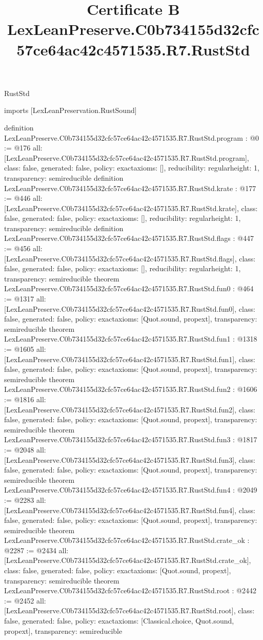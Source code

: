 \begin{lexlean}{RustStd}
\title{Certificate B LexLeanPreserve.C0b734155d32cfc57ce64ac42c4571535.R7.RustStd}
\begin{coremodule}
imports [LexLeanPreservation.RustSound]

definition LexLeanPreserve.C0b734155d32cfc57ce64ac42c4571535.R7.RustStd.program : @0 := @176 {
  all: [LexLeanPreserve.C0b734155d32cfc57ce64ac42c4571535.R7.RustStd.program],
  class: false,
  generated: false,
  policy: exact{axioms: []},
  reducibility: regular{height: 1},
  transparency: semireducible
}
definition LexLeanPreserve.C0b734155d32cfc57ce64ac42c4571535.R7.RustStd.krate : @177 := @446 {
  all: [LexLeanPreserve.C0b734155d32cfc57ce64ac42c4571535.R7.RustStd.krate],
  class: false,
  generated: false,
  policy: exact{axioms: []},
  reducibility: regular{height: 1},
  transparency: semireducible
}
definition LexLeanPreserve.C0b734155d32cfc57ce64ac42c4571535.R7.RustStd.flags : @447 := @456 {
  all: [LexLeanPreserve.C0b734155d32cfc57ce64ac42c4571535.R7.RustStd.flags],
  class: false,
  generated: false,
  policy: exact{axioms: []},
  reducibility: regular{height: 1},
  transparency: semireducible
}
theorem LexLeanPreserve.C0b734155d32cfc57ce64ac42c4571535.R7.RustStd.fun0 : @464 := @1317 {
  all: [LexLeanPreserve.C0b734155d32cfc57ce64ac42c4571535.R7.RustStd.fun0],
  class: false,
  generated: false,
  policy: exact{axioms: [Quot.sound, propext]},
  transparency: semireducible
}
theorem LexLeanPreserve.C0b734155d32cfc57ce64ac42c4571535.R7.RustStd.fun1 : @1318 := @1605 {
  all: [LexLeanPreserve.C0b734155d32cfc57ce64ac42c4571535.R7.RustStd.fun1],
  class: false,
  generated: false,
  policy: exact{axioms: [Quot.sound, propext]},
  transparency: semireducible
}
theorem LexLeanPreserve.C0b734155d32cfc57ce64ac42c4571535.R7.RustStd.fun2 : @1606 := @1816 {
  all: [LexLeanPreserve.C0b734155d32cfc57ce64ac42c4571535.R7.RustStd.fun2],
  class: false,
  generated: false,
  policy: exact{axioms: [Quot.sound, propext]},
  transparency: semireducible
}
theorem LexLeanPreserve.C0b734155d32cfc57ce64ac42c4571535.R7.RustStd.fun3 : @1817 := @2048 {
  all: [LexLeanPreserve.C0b734155d32cfc57ce64ac42c4571535.R7.RustStd.fun3],
  class: false,
  generated: false,
  policy: exact{axioms: [Quot.sound, propext]},
  transparency: semireducible
}
theorem LexLeanPreserve.C0b734155d32cfc57ce64ac42c4571535.R7.RustStd.fun4 : @2049 := @2283 {
  all: [LexLeanPreserve.C0b734155d32cfc57ce64ac42c4571535.R7.RustStd.fun4],
  class: false,
  generated: false,
  policy: exact{axioms: [Quot.sound, propext]},
  transparency: semireducible
}
theorem LexLeanPreserve.C0b734155d32cfc57ce64ac42c4571535.R7.RustStd.crate_ok : @2287 := @2434 {
  all: [LexLeanPreserve.C0b734155d32cfc57ce64ac42c4571535.R7.RustStd.crate_ok],
  class: false,
  generated: false,
  policy: exact{axioms: [Quot.sound, propext]},
  transparency: semireducible
}
theorem LexLeanPreserve.C0b734155d32cfc57ce64ac42c4571535.R7.RustStd.root : @2442 := @2452 {
  all: [LexLeanPreserve.C0b734155d32cfc57ce64ac42c4571535.R7.RustStd.root],
  class: false,
  generated: false,
  policy: exact{axioms: [Classical.choice, Quot.sound, propext]},
  transparency: semireducible
}


\end{coremodule}
\end{lexlean}
